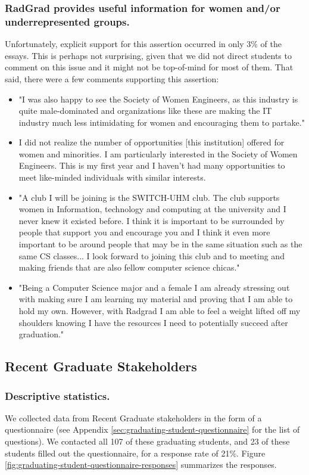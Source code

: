 \documentclass[acmsmall]{acmart}
\begin{document}
\subsubsection{RadGrad provides useful information for women and/or underrepresented groups.} Unfortunately, explicit support for this assertion occurred in only 3\% of the essays. This is perhaps not surprising, given that we did not direct students to comment on this issue and it might not be top-of-mind for most of them. That said, there were a few comments supporting this assertion:

\begin{itemize}[leftmargin=*]
\item "I was also happy to see the Society of Women Engineers, as this industry is quite male-dominated and organizations like these are making the IT industry much less intimidating for women and encouraging them to partake."
\item I did not realize the number of opportunities [this institution] offered for women and minorities. I am particularly interested in the Society of Women Engineers. This is my first year and I haven't had many opportunities to meet like-minded individuals with similar interests.
\item "A club I will be joining is the SWITCH-UHM club. The club supports women in Information, technology and computing at the university and I never knew it existed before. I think it is important to be surrounded by people that support you and encourage you and I think it even more important to be around people that may be in the same situation such as the same CS classes... I look forward to joining this club and to meeting and making friends that are also fellow computer science chicas."
\item "Being a Computer Science major and a female I am already stressing out with making sure I am learning my material and proving that I am able to hold my own. However, with Radgrad I am able to feel a weight lifted off my shoulders knowing I have the resources I need to potentially succeed after graduation."
\end{itemize}

\subsection{Recent Graduate Stakeholders}

\subsubsection{Descriptive statistics.} We collected data from Recent Graduate stakeholders in the form of a questionnaire (see Appendix \ref{sec:graduating-student-questionnaire} for the list of questions). We contacted all 107 of these graduating students, and 23 of these students filled out the questionnaire, for a response rate of 21\%.  Figure \ref{fig:graduating-student-questionnaire-responses} summarizes the responses.
\end{document}

